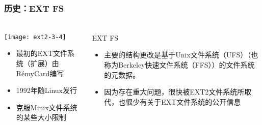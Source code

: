 \begin{frame}[fragile]
	\frametitle{历史：EXT FS}
	
	\frametitle{ }
	\begin{columns}[t]
		\begin{column}{.35\textwidth}

			\texttt{[image: ext2-3-4]}
			\begin{itemize}
				\item 最初的EXT文件系统（扩展）由RémyCard编写
				\item 1992年随Linux发行
				\item 克服Minix文件系统的某些大小限制
				
			\end{itemize}
			
		\end{column}
		
		\begin{column}{.7\textwidth}			
			EXT FS
			\begin{itemize}
				\item 主要的结构更改是基于Unix文件系统（UFS）（也称为Berkeley快速文件系统（FFS））的文件系统的元数据。
				\item 因为存在重大问题，很快被EXT2文件系统所取代，也很少有关于EXT文件系统的公开信息
			\end{itemize}
			
		\end{column}
	\end{columns}
	
\end{frame}


